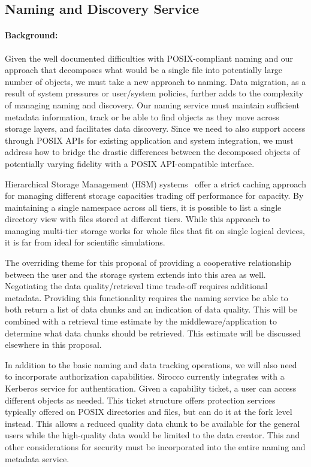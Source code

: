 \subsection{Naming and Discovery Service}
\label{sec:naming-discovery}
\paragraph{Background:}
Given the well documented difficulties with POSIX-compliant naming and our
approach that decomposes what would be a single file into potentially large
number of objects, we must take a new approach to naming.  Data migration, as a
result of system pressures or user/system policies, further adds to the
complexity of managing naming and discovery. Our naming service must maintain
sufficient metadata information, track or be able to find objects as they move
across storage layers, and facilitates data discovery. Since we need to also
support access through POSIX APIs for existing application and system
integration, we must address how to bridge the drastic differences between the
decomposed objects of potentially varying fidelity
with a POSIX API-compatible interface.

Hierarchical Storage Management (HSM) systems~\cite{blaze:1992:hsm} offer a
strict caching approach for managing different storage capacities trading off
performance for capacity.  By maintaining a single namespace across all tiers,
it is possible to list a single directory view with files stored at different
tiers. While this approach to managing multi-tier storage works for whole files
that fit on single logical devices, it is far from ideal for scientific
simulations.

The overriding theme for this proposal of providing a cooperative relationship
between the user and the storage system extends into this area as well.
Negotiating the data quality/retrieval time trade-off requires additional
metadata.  Providing this functionality requires the naming service be able to
both return a list of data chunks and an indication of data quality. This
will be combined with a retrieval time estimate by the
middleware/application to determine what data chunks should be retrieved.  This estimate
will be discussed elsewhere in this proposal.

In addition to the basic naming and data tracking operations, we will also need
to incorporate authorization capabilities. Sirocco currently integrates with a
Kerberos service for authentication. Given a capability ticket, a user can
access different objects as needed. This ticket structure offers protection
services typically offered on POSIX directories and files, but can do it at the
fork level instead. This allows a reduced quality data chunk to be available
for the general users while the high-quality data would be limited to the
data creator. This and other considerations for security must be incorporated
into the entire naming and metadata service.

